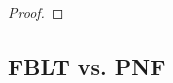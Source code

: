 \documentclass[prodmode,acmtecs]{acmsmall}
\begin{document}
\begin{compactenum}
\begin{proof}

\end{proof}

\subsection{FBLT vs. PNF}
\label{sec:fblt vs pnf}


\end{compactenum}
\end{document}
